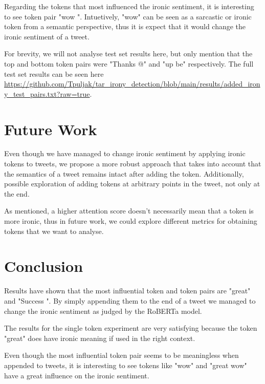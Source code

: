 \documentclass[10pt, a4paper]{article}
\begin{document}
Regarding the tokens that most influenced the ironic sentiment, it is interesting to see token pair "wow \textvisiblespace ".
Intuetively, "wow" can be seen as a sarcastic or ironic token from a semantic perspective, thus it is expect that it would change the ironic sentiment of a tweet.

For brevity, we will not analyse test set results here, but only mention that the top and bottom token pairs were "Thanks @" and "up be" respectively.
The full test set results can be seen here \url{https://github.com/Tpuljak/tar_irony_detection/blob/main/results/added_irony_test_pairs.txt?raw=true}.

\section{Future Work}

Even though we have managed to change ironic sentiment by applying ironic tokens to tweets, we propose a more robust approach that takes into account that the semantics of a tweet remains intact after adding the token.
Additionally, possible exploration of adding tokens at arbitrary points in the tweet, not only at the end.

As mentioned, a higher attention score doesn't necessarily mean that a token is more ironic, thus in future work, we could explore different metrics for obtaining tokens that we want to analyse.

\section{Conclusion}

Results have shown that the most influential token and token pairs are "great" and "Success \textvisiblespace ".
By simply appending them to the end of a tweet we managed to change the ironic sentiment as judged by the RoBERTa model.

The results for the single token experiment are very satisfying because the token "great" does have ironic meaning if used in the right context.

Even though the most influential token pair seems to be meaningless when appended to tweets, it is interesting to see tokens like "wow" and "great wow" have a great influence on the ironic sentiment.


 
\end{document}
